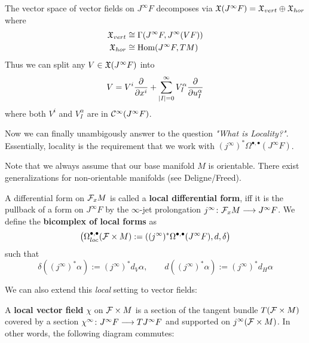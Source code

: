 \begin{corollary}
  The vector space of vector fields on $J^\infty F$ decomposes via $\mathfrak{X}(J^\infty F) = \mathfrak{X}_{vert} \oplus \mathfrak{X}_{hor}$ where
  \begin{align*}
    \mathfrak{X}_{vert} &\cong \Gamma(J^\infty F, J^\infty(VF))\\
    \mathfrak{X}_{hor} &\cong \operatorname{Hom}(J^\infty F, TM)
  \end{align*}
  Thus we can split any $V \in \mathfrak{X}(J^\infty F)$ into
  $$ V = V^i \frac{\partial }{\partial x^i} + \sum_{|I|=0}^\infty V^\alpha_I \frac{\partial }{\partial u^\alpha_I} $$
  where both $V^i$ and $V^\alpha_I$ are in $\mathcal{C}^{\infty}(J^\infty F)$.
\end{corollary}

Now we can finally unambigously answer to the question \emph{"What is Locality?"}. Essentially, locality is the requirement that we work with $(j^\infty)^* \Omega^{\bullet, \bullet}(J^\infty F)$.

\begin{rem}
  Note that we always assume that our base manifold $M$ is orientable. There exist generalizations for non-orientable manifolds (see Deligne/Freed).
\end{rem}

\begin{definition}
  A differential form on ${\mathcal{F}}_x M$ is called a \textbf{local differential form}, iff it is the pullback of a form on $J^\infty F$ by the $\infty$-jet prolongation $j^\infty\colon {\mathcal{F}}_x M \longrightarrow J^\infty F$. We define the \textbf{bicomplex of local forms} as
  $$ \left( \Omega^{\bullet, \bullet}_{loc} ({\mathcal{F}} \times M) := ((j^\infty )^* \Omega^{\bullet, \bullet} (J^\infty F), d, \delta \right) $$
  such that
  $$ \delta((j^\infty)^* \alpha) := (j^\infty)^* d_V \alpha, \quad \quad d((j^\infty)^* \alpha) := (j^\infty)^* d_H \alpha $$
\end{definition}

We can also extend this \emph{local} setting to vector fields:

\begin{definition}
  A \textbf{local vector field} $\chi$ on ${\mathcal{F}} \times M$ is a section of the tangent bundle $T({\mathcal{F}}\times M)$ covered by a section $\chi^\infty\colon J^\infty F \longrightarrow TJ^\infty F$ and supported on $j^\infty({\mathcal{F}} \times M)$. In other words, the following diagram commutes:
  \begin{center}
  \end{center}
\end{definition}


